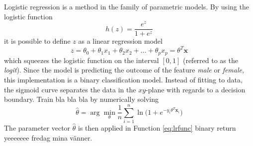 Logistic regression is a method in the family of parametric models. By using the logistic function
\begin{equation}
  h(z) = \frac{e^{z}}{1+e^{z}}
  \label{eq:lrfunc}
\end{equation}
it is possible to define $z$ as a linear regression model
\begin{equation}
  z=\theta_0+\theta_1x_1+\theta_2x_2+\ldots+\theta_p x_p = \theta^{T}\textbf{x}
  \label{eq:lrcoeff}
\end{equation}
which squeezes the logistic function on the interval $[0,1]$ (referred to as the \textit{logit}). Since the model is predicting the outcome of the feature \textit{male} or \textit{female}, this implementation is a binary classification model. Instead of fitting to data, the sigmoid curve separates the data in the $xy$-plane with regards to a decision boundary. Train bla bla bla by numerically solving
 \begin{equation}
   \hat{\theta}=\arg\min_\theta \frac{1}{n} \sum_{i=1}^{n}\ln\bigg(1+e^{-y_i\theta^T \textbf{x}_i}\bigg)
\end{equation}
The parameter vector $\hat{\theta}$ is then applied in Function \ref{eq:lrfunc} binary return yeeeeeee fredag mina vänner.
